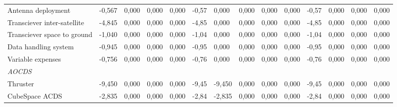 \begin{landscape}
\begin{table}[]
{\begin{tabular}{| l | l | l | l | l | l | l | l | l | l | l | l | l | l |}
Antenna deployment                                                                     & -0,567           & 0,000           & 0,000           & 0,000           & -0,57           & 0,000           & 0,000           & 0,000           & 0,000           & -0,57           & 0,000            & 0,000            & 0,000            \\
Transciever inter-satellite                                                            & -4,845           & 0,000           & 0,000           & 0,000           & -4,85           & 0,000           & 0,000           & 0,000           & 0,000           & -4,85           & 0,000            & 0,000            & 0,000            \\
Transciever space to ground                                                            & -1,040           & 0,000           & 0,000           & 0,000           & -1,04           & 0,000           & 0,000           & 0,000           & 0,000           & -1,04           & 0,000            & 0,000            & 0,000            \\
Data handling system                                                                   & -0,945           & 0,000           & 0,000           & 0,000           & -0,95           & 0,000           & 0,000           & 0,000           & 0,000           & -0,95           & 0,000            & 0,000            & 0,000            \\
Variable expenses                                                                      & -0,756           & 0,000           & 0,000           & 0,000           & -0,76           & 0,000           & 0,000           & 0,000           & 0,000           & -0,76           & 0,000            & 0,000            & 0,000            \\
\textit{AOCDS}                                                                         &                  &                 &                 &                 &                 &                 &                 &                 &                 &                 &                  &                  &                  \\
Thruster                                                                               & -9,450           & 0,000           & 0,000           & 0,000           & -9,45           & -9,450          & 0,000           & 0,000           & 0,000           & -9,45           & 0,000            & 0,000            & 0,000            \\
CubeSpace ACDS                                                                         & -2,835           & 0,000           & 0,000           & 0,000           & -2,84           & -2,835          & 0,000           & 0,000           & 0,000           & -2,84           & 0,000            & 0,000            & 0,000            \\

\end{tabular}}
\end{table}
\end{landscape}

